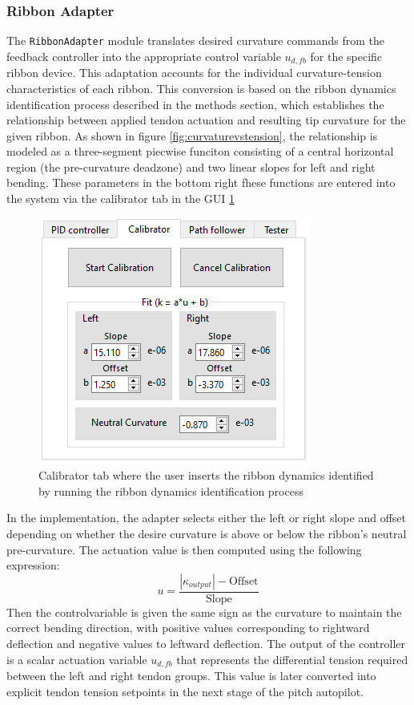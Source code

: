 \subsubsection{Ribbon Adapter}
The \texttt{RibbonAdapter} module translates desired curvature commands from the feedback controller into the appropriate control variable \(u_{d,fb}\) for the specific ribbon device. This adaptation accounts for the individual curvature-tension characteristics of each ribbon. This conversion is based on the ribbon dynamics identification process described in the methods section, which establishes the relationship between applied tendon actuation and resulting tip curvature for the given ribbon. As shown in figure \ref{fig:curvaturevstension}, the relationship is modeled as a three-segment piecwise funciton consisting of a central horizontal region (the pre-curvature deadzone) and two linear slopes for left and right bending. These parameters in the bottom right fhese functions are entered into the system via the calibrator tab in the GUI \ref{fig:calibratortab}
\begin{figure}
    \centering
    \includegraphics[width=0.5\linewidth]{images/gui/calibrator.PNG}
    \caption{Calibrator tab where the user inserts the ribbon dynamics identified by running the ribbon dynamics identification process}
    \label{fig:calibratortab}
\end{figure}

In the implementation, the adapter selects either the left or right slope and offset depending on whether the desire curvature is above or below the ribbon's neutral pre-curvature. The actuation value is then computed using the following expression:
\begin{equation}
u = \frac{|\kappa_{output}| - \text{Offset}}{\text{Slope}}
\end{equation}
Then the controlvariable is given the same sign as the curvature to maintain the correct bending direction, with positive values corresponding to rightward deflection and negative values to leftward deflection.
\newline \newline
The output of the controller is a scalar actuation variable \(u_{d,fb}\) that represents the differential tension required between the left and right tendon groups. This value is later converted into explicit tendon tension setpoints in the next stage of the pitch autopilot.

